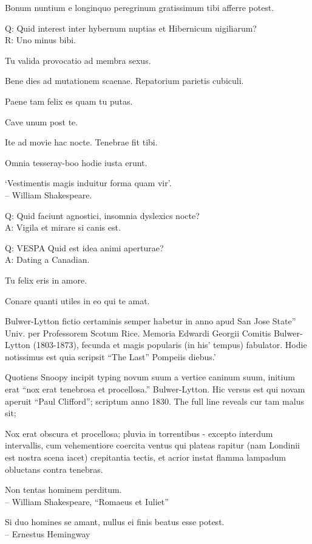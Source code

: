 \documentclass[titlepage,12pt]{memoir}
\begin{document}
Bonum nuntium e longinquo peregrinum gratissimum tibi afferre potest.

Q: Quid interest inter hybernum nuptias et Hibernicum uigiliarum?\\
R: Uno minus bibi.

Tu valida provocatio ad membra sexus.

Bene dies ad mutationem scaenae. Repatorium parietis cubiculi.

Paene tam felix es quam tu putas.

Cave unum post te.

Ite ad movie hac nocte. Tenebrae fit tibi.

Omnia tesseray-boo hodie iusta erunt.

‘Vestimentis magis induitur forma quam vir’.
\\-- William Shakespeare.

Q: Quid faciunt agnostici, insomnia dyslexics nocte?\\
A: Vigila et mirare si canis est.

Q: VESPA Quid est idea animi aperturae?\\
A: Dating a Canadian.

Tu felix eris in amore.

Conare quanti utiles in eo qui te amat.

Bulwer-Lytton fictio certaminis semper habetur in anno apud San Jose State”
Univ. per Professorem Scotum Rice. Memoria Edwardi Georgii
Comitis Bulwer-Lytton (1803-1873), fecunda et magis popularis (in his’
tempus) fabulator. Hodie notissimus est quia scripsit “The Last”
Pompeiis diebus.’

Quotiens Snoopy incipit typing novum suum a vertice caninum suum,
initium erat “nox erat tenebrosa et procellosa.”
Bulwer-Lytton. Hic versus est qui novam aperuit “Paul Clifford”;
scriptum anno 1830. The full line reveals cur tam malus sit;

Nox erat obscura et procellosa; pluvia in torrentibus - excepto
interdum intervallis, cum vehementiore coercita
ventus qui plateas rapitur (nam Londinii est nostra scena
iacet) crepitantia tectis, et acrior instat
flamma lampadum obluctans contra tenebras.

Non tentas hominem perditum.
\\-- William Shakespeare, “Romaeus et Iuliet”

Si duo homines se amant, nullus ei finis beatus esse potest.
\\-- Ernestus Hemingway
\end{document}
